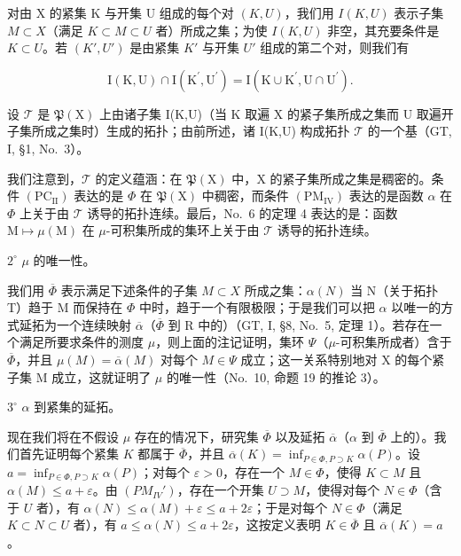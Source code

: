 对由 X 的紧集 K 与开集 U 组成的每个对 \((K,U)\)，我们用 \(I(K,U)\) 表示子集 \(M \subset X\)（满足 \(K \subset M \subset U\) 者）所成之集；为使 \(I(K,U)\) 非空，其充要条件是 \(K \subset U\)。若 \((K',U')\) 是由紧集 \(K'\) 与开集 \(U'\) 组成的第二个对，则我们有

\[
\mathrm{I} (\mathrm{K}, \mathrm{U}) \cap \mathrm{I} (\mathrm{K} ^ {\prime}, \mathrm{U} ^ {\prime}) = \mathrm{I} (\mathrm{K} \cup \mathrm{K} ^ {\prime}, \mathrm{U} \cap \mathrm{U} ^ {\prime}).
\]

设 \(\mathcal{T}\) 是 \(\mathfrak{P}(\mathrm{X})\) 上由诸子集 I(K,U)（当 K 取遍 X 的紧子集所成之集而 U 取遍开子集所成之集时）生成的拓扑；由前所述，诸 I(K,U) 构成拓扑 \(\mathcal{T}\) 的一个基（GT, I, §1, No.~3）。

我们注意到，\(\mathcal{T}\) 的定义蕴涵：在 \(\mathfrak{P}(\mathrm{X})\) 中，\(\mathrm{X}\) 的紧子集所成之集是稠密的。条件 \((\mathrm{PC}_{\mathrm{II}})\) 表达的是 \(\Phi\) 在 \(\mathfrak{P}(\mathrm{X})\) 中稠密，而条件 \((\mathrm{PM}_{\mathrm{IV}})\) 表达的是函数 \(\alpha\) 在 \(\Phi\) 上关于由 \(\mathcal{T}\) 诱导的拓扑连续。最后，No.~6 的定理 4 表达的是：函数 \(\mathrm{M} \mapsto \mu(\mathrm{M})\) 在 \(\mu\)-可积集所成的集环上关于由 \(\mathcal{T}\) 诱导的拓扑连续。

\(2^{\circ}\) \(\mu\) 的唯一性。

我们用 \(\overline{\Phi}\) 表示满足下述条件的子集 \(M \subset X\) 所成之集：\(\alpha(N)\) 当 N（关于拓扑 T）趋于 M 而保持在 \(\Phi\) 中时，趋于一个有限极限；于是我们可以把 \(\alpha\) 以唯一的方式延拓为一个连续映射 \(\overline{\alpha}\)（\(\overline{\Phi}\) 到 R 中的）（GT, I, §8, No.~5, 定理 1）。若存在一个满足所要求条件的测度 \(\mu\)，则上面的注记证明，集环 \(\Psi\)（\(\mu\)-可积集所成者）含于 \(\overline{\Phi}\)，并且 \(\mu(M) = \overline{\alpha}(M)\) 对每个 \(M \in \Psi\) 成立；这一关系特别地对 X 的每个紧子集 M 成立，这就证明了 \(\mu\) 的唯一性（No.~10, 命题 19 的推论 3）。

\(3^{\circ}\) \(\alpha\) 到紧集的延拓。

现在我们将在不假设 \(\mu\) 存在的情况下，研究集 \(\overline{\Phi}\) 以及延拓 \(\overline{\alpha}\)（\(\alpha\) 到 \(\overline{\Phi}\) 上的）。我们首先证明每个紧集 \(K\) 都属于 \(\overline{\Phi}\)，并且 \(\overline{\alpha}(K) = \inf_{P \in \Phi, P \supset K} \alpha(P)\)。设 \(a = \inf_{P \in \Phi, P \supset K} \alpha(P)\)；对每个 \(\varepsilon > 0\)，存在一个 \(M \in \Phi\)，使得 \(K \subset M\) 且 \(\alpha(M) \leqslant a + \varepsilon\)。由 \((PM_{IV}')\)，存在一个开集 \(U \supset M\)，使得对每个 \(N \in \Phi\)（含于 \(U\) 者），有 \(\alpha(N) \leqslant \alpha(M) + \varepsilon \leqslant a + 2\varepsilon\)；于是对每个 \(N \in \Phi\)（满足 \(K \subset N \subset U\) 者），有 \(a \leqslant \alpha(N) \leqslant a + 2\varepsilon\)，这按定义表明 \(K \in \overline{\Phi}\) 且 \(\overline{\alpha}(K) = a\)。


